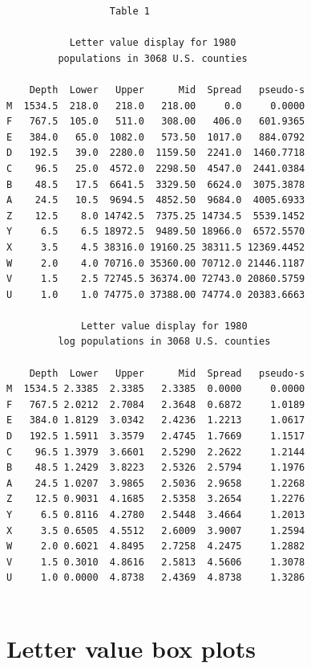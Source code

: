 \documentclass[11pt]{article}
\begin{document}
\begin{verbatim}
                  Table 1

           Letter value display for 1980
         populations in 3068 U.S. counties

    Depth  Lower   Upper      Mid  Spread   pseudo-s
M  1534.5  218.0   218.0   218.00     0.0     0.0000
F   767.5  105.0   511.0   308.00   406.0   601.9365
E   384.0   65.0  1082.0   573.50  1017.0   884.0792
D   192.5   39.0  2280.0  1159.50  2241.0  1460.7718
C    96.5   25.0  4572.0  2298.50  4547.0  2441.0384
B    48.5   17.5  6641.5  3329.50  6624.0  3075.3878
A    24.5   10.5  9694.5  4852.50  9684.0  4005.6933
Z    12.5    8.0 14742.5  7375.25 14734.5  5539.1452
Y     6.5    6.5 18972.5  9489.50 18966.0  6572.5570
X     3.5    4.5 38316.0 19160.25 38311.5 12369.4452
W     2.0    4.0 70716.0 35360.00 70712.0 21446.1187
V     1.5    2.5 72745.5 36374.00 72743.0 20860.5759
U     1.0    1.0 74775.0 37388.00 74774.0 20383.6663

             Letter value display for 1980
         log populations in 3068 U.S. counties

    Depth  Lower   Upper      Mid  Spread   pseudo-s
M  1534.5 2.3385  2.3385   2.3385  0.0000     0.0000
F   767.5 2.0212  2.7084   2.3648  0.6872     1.0189
E   384.0 1.8129  3.0342   2.4236  1.2213     1.0617
D   192.5 1.5911  3.3579   2.4745  1.7669     1.1517
C    96.5 1.3979  3.6601   2.5290  2.2622     1.2144
B    48.5 1.2429  3.8223   2.5326  2.5794     1.1976
A    24.5 1.0207  3.9865   2.5036  2.9658     1.2268
Z    12.5 0.9031  4.1685   2.5358  3.2654     1.2276
Y     6.5 0.8116  4.2780   2.5448  3.4664     1.2013
X     3.5 0.6505  4.5512   2.6009  3.9007     1.2594
W     2.0 0.6021  4.8495   2.7258  4.2475     1.2882
V     1.5 0.3010  4.8616   2.5813  4.5606     1.3078
U     1.0 0.0000  4.8738   2.4369  4.8738     1.3286


\end{verbatim}

\section{Letter value box plots}
\end{document}
